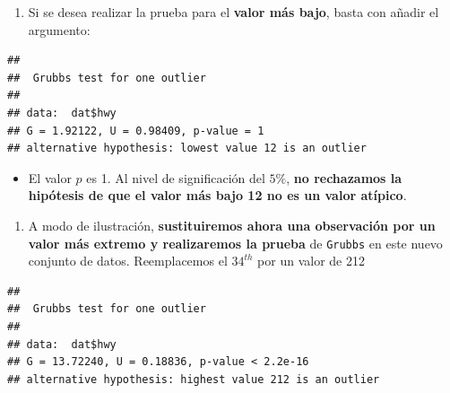 \documentclass[
]{book}
\newenvironment{Shaded}{\begin{snugshade}}{\end{snugshade}}
\newcommand{\AttributeTok}[1]{\textcolor[rgb]{0.13,0.29,0.53}{#1}}
\newcommand{\ConstantTok}[1]{\textcolor[rgb]{0.56,0.35,0.01}{#1}}
\newcommand{\DecValTok}[1]{\textcolor[rgb]{0.00,0.00,0.81}{#1}}
\newcommand{\FunctionTok}[1]{\textcolor[rgb]{0.13,0.29,0.53}{\textbf{#1}}}
\newcommand{\NormalTok}[1]{#1}
\newcommand{\OtherTok}[1]{\textcolor[rgb]{0.56,0.35,0.01}{#1}}
\newcommand{\SpecialCharTok}[1]{\textcolor[rgb]{0.81,0.36,0.00}{\textbf{#1}}}
\newcommand{\StringTok}[1]{\textcolor[rgb]{0.31,0.60,0.02}{#1}}
\providecommand{\tightlist}{%
  \setlength{\itemsep}{0pt}\setlength{\parskip}{0pt}}
\begin{document}
\begin{enumerate}
\def\labelenumi{\arabic{enumi}.}
\setcounter{enumi}{1}
\tightlist
\item
  Si se desea realizar la prueba para el \textbf{valor más bajo}, basta con añadir el argumento:
\end{enumerate}

\begin{Shaded}
\end{Shaded}

\begin{verbatim}
## 
##  Grubbs test for one outlier
## 
## data:  dat$hwy
## G = 1.92122, U = 0.98409, p-value = 1
## alternative hypothesis: lowest value 12 is an outlier
\end{verbatim}

\begin{itemize}
\tightlist
\item
  El valor \(p\) es 1. Al nivel de significación del \(5\%\), \textbf{no rechazamos la hipótesis de que el valor más bajo 12 no es un valor atípico}.
\end{itemize}

\begin{enumerate}
\def\labelenumi{\arabic{enumi}.}
\setcounter{enumi}{2}
\tightlist
\item
  A modo de ilustración, \textbf{sustituiremos ahora una observación por un valor más extremo y realizaremos la prueba} de \texttt{Grubbs} en este nuevo conjunto de datos. Reemplacemos el \(34^{th}\) por un valor de 212
\end{enumerate}

\begin{Shaded}
\end{Shaded}

\begin{verbatim}
## 
##  Grubbs test for one outlier
## 
## data:  dat$hwy
## G = 13.72240, U = 0.18836, p-value < 2.2e-16
## alternative hypothesis: highest value 212 is an outlier
\end{verbatim}
\end{document}
